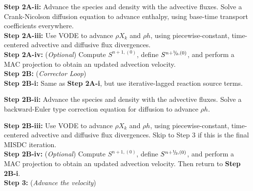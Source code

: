 {\bf Step 2A-ii:} Advance the species and density with the advective fluxes.  Solve a Crank-Nicolson diffusion equation to advance enthalpy, using base-time transport coefficients everywhere.\\

{\bf Step 2A-iii:} Use VODE to advance $\rho X_k$ and $\rho h$, using piecewise-constant, time-centered advective and diffusive flux divergences.\\

{\bf Step 2A-iv:} ({\it Optional}) Compute $S^{n+1,(0)}$, define $S^{n+\myhalf,(0)}$, and perform a MAC projection to obtain an updated advection velocity.\\

{\bf Step 2B:} ({\it Corrector Loop})\\

{\bf Step 2B-i:} Same as {\bf Step 2A-i}, but use iterative-lagged reaction source terms.

{\bf Step 2B-ii:} Advance the species and density with the advective fluxes.  Solve a backward-Euler type correction equation for diffusion to advance $\rho h$.

{\bf Step 2B-iii:} Use VODE to advance $\rho X_k$ and $\rho h$, using piecewise-constant, time-centered advective and diffusive flux divergences.  Skip to Step 3 if this is the final MISDC iteration.\\

{\bf Step 2B-iv:} ({\it Optional}) Compute $S^{n+1,(0)}$, define $S^{n+\myhalf,(0)}$, and perform a MAC projection to obtain an updated advection velocity.  Then return to {\bf Step 2B-i}.\\

{\bf Step 3:} ({\it Advance the velocity})\\
